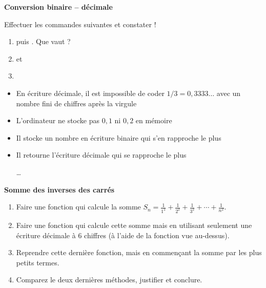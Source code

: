 \begin{frame}

\hfill\hfill\textbf{Conversion binaire -- décimale}

\begin{tp}
Effectuer les commandes suivantes et constater !
\begin{enumerate}
  \item {} puis . Que vaut  ?
  \item {} \quad et \quad  {} 
  \item {}
\end{enumerate}  
\end{tp}

\pause

\begin{itemize}

  \item En écriture décimale, il est impossible de coder $1/3 = 0,3333\ldots$ avec un nombre fini
de chiffres après la virgule
\pause
  \item L'ordinateur ne stocke pas $0,1$ ni $0,2$ en mémoire
\pause
  \item Il stocke un nombre en écriture binaire qui s'en rapproche le plus
\pause  
  \item Il retourne l'écriture décimale qui se rapproche le plus
 \centerline{\ldots}
\end{itemize}

\end{frame}
 
\begin{frame}

\hfill\hfill\textbf{Somme des inverses des carrés}

\begin{tp}
\begin{enumerate}
  \item Faire une fonction qui calcule la somme $S_n = \frac{1}{1^2} + \frac{1}{2^2}+\frac{1}{3^2}+\cdots + \frac{1}{n^2}$.

  \item Faire une fonction qui calcule cette somme mais en utilisant seulement une écriture décimale à $6$ chiffres 
  (à l'aide de la fonction  vue au-dessus).
  
  \item Reprendre cette dernière fonction, mais en commençant la somme par les plus petits termes.
  
  \item Comparez le deux dernières méthodes, justifier et conclure.
\end{enumerate}  
\end{tp}
\end{frame}




